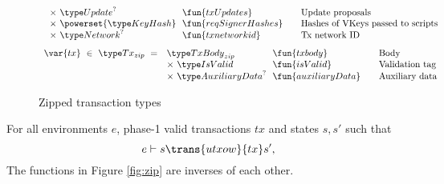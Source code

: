 \begin{property}
\begin{figure*}[htb]
\begin{equation*}
\begin{array}{r@{~~}l@{~~}l@{\qquad}l}
       & \times ~\Update^?  & \fun{txUpdates} & \text{Update proposals}\\
       & \times ~\powerset{\KeyHash} & \fun{reqSignerHashes} & \text{Hashes of VKeys passed to scripts}\\
       & \times ~\Network^? & \fun{txnetworkid} & \text{Tx network ID}\\
    \end{array}
  \end{equation*}
  \begin{equation*}
    \begin{array}{r@{~~}l@{~~}l@{\qquad}l}
      \var{tx} ~\in~ \Tx_{zip} ~=~
      & \TxBody_{zip} & \fun{txbody} & \text{Body}\\
      & \times ~\IsValid & \fun{isValid} & \text{Validation tag}\\
      & \times ~\AuxiliaryData^? & \fun{auxiliaryData}&\text{Auxiliary data}\\
    \end{array}
  \end{equation*}
  \caption{Zipped transaction types}
  \label{fig:zipped-types}
\end{figure*}

\begin{lemma}
  For all environments $e$, phase-1 valid transactions $tx$ and states $s, s'$ such that
  \begin{equation*}
    e\vdash s\trans{utxow}{tx}s',
  \end{equation*}
  The functions in Figure \ref{fig:zip} are inverses of each other.


\end{lemma}
\end{property}
